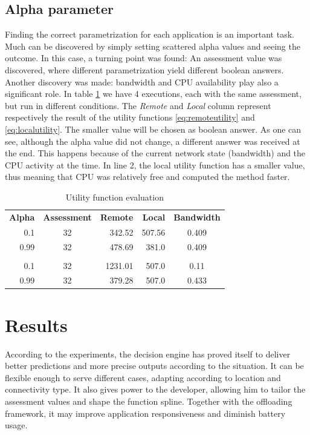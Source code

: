 \documentclass[10pt, conference, letterpaper]{IEEEtran}
\begin{document}
  \subsection{Alpha parameter}

  Finding the correct parametrization for each application is an important task. Much can be discovered by simply setting scattered alpha values and seeing the outcome. In this case, a turning point was found: An assessment value was discovered, where different parametrization yield different boolean answers. Another discovery was made: bandwidth and CPU availability play also a significant role. In table \ref{table:alpha} we have 4 executions, each with the same assessment, but run in different conditions. The \textit{Remote} and \textit{Local} column represent respectively the result of the utility functions \ref{eq:remoteutility} and \ref{eq:localutility}. The smaller value will be chosen as boolean answer. As one can see, although the alpha value did not change, a different answer was received at the end. This happens because of the current network state (bandwidth) and the CPU activity at the time. In line 2, the local utility function has a smaller value, thus meaning that CPU was relatively free and computed the method faster.

  \begin{table}[!t]
  \centering
  \caption{Utility function evaluation}
  \label{table:alpha}
  \begin{tabular}{rcrrc}
    \textbf{Alpha} & \textbf{Assessment} & \textbf{Remote} & \textbf{Local} & \textbf{Bandwidth} \\
   0.1 & 32  & 342.52 & 507.56 & 0.409  \\
   0.99 & 32  & 478.69 & 381.0 & 0.409  \\
   &  & & &  \\
   0.1 & 32  & 1231.01 & 507.0 & 0.11  \\
   0.99 & 32  & 379.28 & 507.0 & 0.433  \\
  \end{tabular}
  \end{table}

  \section{Results}
  According to the experiments, the decision engine has proved itself to deliver better predictions and more precise outputs according to the situation. It can be flexible enough to serve different cases, adapting according to location and connectivity type. It also gives power to the developer, allowing him to tailor the assessment values and shape the function spline. Together with the offloading framework, it may improve application responsiveness and diminish battery usage.
  
\end{document}
